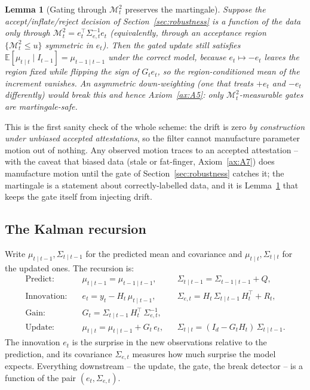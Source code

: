 \documentclass[11pt]{book}
\theoremstyle{plain}
\newtheorem{lemma}[theorem]{Lemma}
\theoremstyle{definition}
\theoremstyle{remark}
\newcommand{\E}{\mathbb{E}}
\begin{document}
\begin{lemma}[Gating through $\mathcal{M}_t^2$ preserves the martingale]
\label{lem:gate-symmetry}
Suppose the accept/inflate/reject decision of Section~\ref{sec:robustness} is a
function of the data only through $\mathcal{M}_t^2=e_t^{\top}\Sigma_{e,t}^{-1}e_t$
(equivalently, through an acceptance region $\{\mathcal{M}_t^2\le u\}$ symmetric in
$e_t$). Then the gated update still satisfies $\E[\mu_{t\mid t}\mid
I_{t-1}]=\mu_{t-1\mid t-1}$ under the correct model, because $e_t\mapsto -e_t$
leaves the region fixed while flipping the sign of $G_t e_t$, so the
region-conditioned mean of the increment vanishes. An \emph{asymmetric}
down-weighting (one that treats $+e_t$ and $-e_t$ differently) would break this
and hence Axiom~\ref{ax:A5}: only $\mathcal{M}_t^2$-measurable gates are
martingale-safe.
\end{lemma}

This is the first sanity check of the whole scheme: the drift is zero
\emph{by construction under unbiased accepted attestations}, so the filter cannot
manufacture parameter motion out of nothing. Any observed motion traces to an
accepted attestation -- with the caveat that biased data (stale or fat-finger,
Axiom~\ref{ax:A7}) does manufacture motion until the gate of
Section~\ref{sec:robustness} catches it; the martingale is a statement about
correctly-labelled data, and it is Lemma~\ref{lem:gate-symmetry} that keeps the
gate itself from injecting drift.

\subsection{The Kalman recursion}

Write $\mu_{t\mid t-1},\Sigma_{t\mid t-1}$ for the predicted mean and covariance
and $\mu_{t\mid t},\Sigma_{t\mid t}$ for the updated ones. The recursion is:
\begin{align*}
    \text{Predict:}\quad
    & \mu_{t\mid t-1} = \mu_{t-1\mid t-1}, &
    & \Sigma_{t\mid t-1} = \Sigma_{t-1\mid t-1} + Q, \\[2pt]
    \text{Innovation:}\quad
    & e_t = y_t - H_t\,\mu_{t\mid t-1}, &
    & \Sigma_{e,t} = H_t\,\Sigma_{t\mid t-1}\,H_t^{\top} + R_t, \\[2pt]
    \text{Gain:}\quad
    & G_t = \Sigma_{t\mid t-1}\,H_t^{\top}\,\Sigma_{e,t}^{-1}, & & \\[2pt]
    \text{Update:}\quad
    & \mu_{t\mid t} = \mu_{t\mid t-1} + G_t\,e_t, &
    & \Sigma_{t\mid t} = (I_d - G_t H_t)\,\Sigma_{t\mid t-1}.
\end{align*}
The innovation $e_t$ is the surprise in the new observations relative to
the prediction, and its covariance $\Sigma_{e,t}$ measures how much surprise the
model expects. Everything downstream -- the update, the gate, the break detector
-- is a function of the pair $(e_t,\Sigma_{e,t})$.
\end{document}
